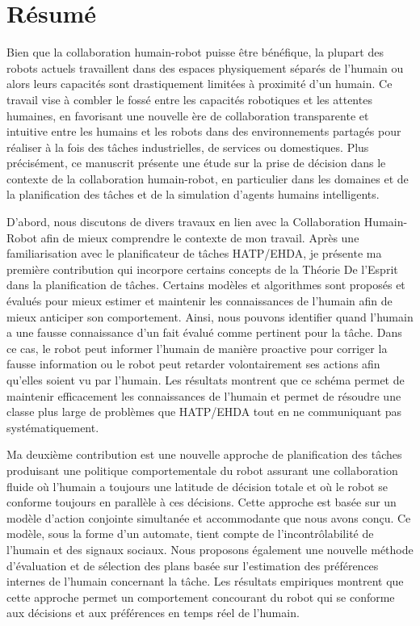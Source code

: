 \chapter*{Résumé}


Bien que la collaboration humain-robot puisse être bénéfique, la plupart des robots actuels travaillent dans des espaces physiquement séparés de l'humain ou alors leurs capacités sont drastiquement limitées à proximité d'un humain. Ce travail vise à combler le fossé entre les capacités robotiques et les attentes humaines, en favorisant une nouvelle ère de collaboration transparente et intuitive entre les humains et les robots dans des environnements partagés pour réaliser à la fois des tâches industrielles, de services ou domestiques. Plus précisément, ce manuscrit présente une étude sur la prise de décision dans le contexte de la collaboration humain-robot, en particulier dans les domaines et de la planification des tâches et de la simulation d'agents humains intelligents.

D'abord, nous discutons de divers travaux en lien avec la Collaboration Humain-Robot afin de mieux comprendre le contexte de mon travail. Après une familiarisation avec le planificateur de tâches HATP/EHDA, je présente ma première contribution qui incorpore certains concepts de la Théorie De l'Esprit dans la planification de tâches. Certains modèles et algorithmes sont proposés et évalués pour mieux estimer et maintenir les connaissances de l'humain afin de mieux anticiper son comportement. Ainsi, nous pouvons identifier quand l'humain a une fausse connaissance d'un fait évalué comme pertinent pour la tâche. Dans ce cas, le robot peut informer l'humain de manière proactive pour corriger la fausse information ou le robot peut retarder volontairement ses actions afin qu'elles soient vu par l'humain. Les résultats montrent que ce schéma permet de maintenir efficacement les connaissances de l'humain et permet de résoudre une classe plus large de problèmes que HATP/EHDA tout en ne communiquant pas systématiquement.

Ma deuxième contribution est une nouvelle approche de planification des tâches produisant une politique comportementale du robot assurant une collaboration fluide où l'humain a toujours une latitude de décision totale et où le robot se conforme toujours en parallèle à ces décisions. Cette approche est basée sur un modèle d'action conjointe simultanée et accommodante que nous avons conçu. Ce modèle, sous la forme d'un automate, tient compte de l'incontrôlabilité de l'humain et des signaux sociaux. Nous proposons également une nouvelle méthode d'évaluation et de sélection des plans basée sur l'estimation des préférences internes de l'humain concernant la tâche. Les résultats empiriques montrent que cette approche permet un comportement concourant du robot qui se conforme aux décisions et aux préférences en temps réel de l'humain.

